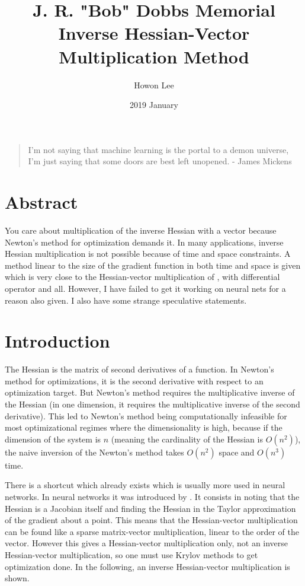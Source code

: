 \documentclass{article}
\begin{document}
\title{J. R. "Bob" Dobbs Memorial Inverse Hessian-Vector Multiplication Method}
\author{Howon Lee}
\date{2019 January}
\maketitle

\begin{quote}
I'm not saying that machine learning is the portal to a demon universe, I'm just saying that some doors are best left unopened. - James Mickens
\end{quote}

\section{Abstract}
You care about multiplication of the inverse Hessian with a vector because Newton's method for optimization demands it. In many applications, inverse Hessian multiplication is not possible because of time and space constraints. A method linear to the size of the gradient function in both time and space is given which is very close to the Hessian-vector multiplication of \cite{pearlmutter1994}, with differential operator and all. However, I have failed to get it working on neural nets for a reason also given. I also have some strange speculative statements.

\section{Introduction}

The Hessian is the matrix of second derivatives of a function. In Newton's method for optimizations, it is the second derivative with respect to an optimization target. But Newton's method requires the multiplicative inverse of the Hessian (in one dimension, it requires the multiplicative inverse of the second derivative). This led to Newton's method being computationally infeasible for most optimizational regimes where the dimensionality is high, because if the dimension of the system is $n$ (meaning the cardinality of the Hessian is $O(n^2)$), the naive inversion of the Newton's method takes $O(n^2)$ space and $O(n^3)$ time.

There is a shortcut which already exists which is usually more used in neural networks. In neural networks it was introduced by \cite{pearlmutter1994}. It consists in noting that the Hessian is a Jacobian itself and finding the Hessian in the Taylor approximation of the gradient about a point. This means that the Hessian-vector multiplication can be found like a sparse matrix-vector multiplication, linear to the order of the vector. However this gives a Hessian-vector multiplication only, not an inverse Hessian-vector multiplication, so one must use Krylov methods to get optimization done\cite{martens2010}. In the following, an inverse Hessian-vector multiplication is shown.
\end{document}
